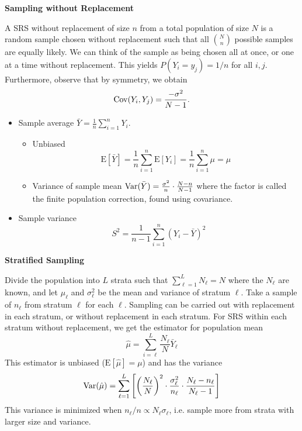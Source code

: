\documentclass[10pt,landscape]{article}
\newcommand{\E}{\text{E}}
\begin{document}
\begin{multicols*}{3}
\textbf{Sampling without Replacement}

A SRS without replacement of size $n$ from a total population of size $N$ is a random sample chosen without replacement such that all $ \binom{N}{n} $ possible samples are equally likely. We can think of the sample as being chosen all at once, or one at a time without replacement. This yields $P(Y_i = y_j) = 1/n$ for all $i,j$. Furthermore, observe that by symmetry, we obtain
\[
\operatorname{Cov}(Y_i,Y_j)=\frac{-\sigma^2}{N-1}.
\]

\begin{itemize}
    \item Sample average $\bar Y=\frac{1}{n}\sum_{i=1}^nY_i$.
    \begin{itemize}
        \item Unbiased
        $$
        \E[\bar Y]=\frac{1}{n}\sum_{i=1}^n\E[Y_i]=\frac{1}{n}\sum_{i=1}^n\mu=\mu
        $$
        \item Variance of sample mean $\operatorname{Var}(\bar Y)=\frac{\sigma^2}{n}\cdot \frac{N-n}{N-1}$ where the factor is called the finite population correction, found using covariance.
    \end{itemize}
    \item Sample variance
    $$
    S^2=\frac{1}{n-1}\sum_{i=1}^n(Y_i-\bar Y)^2
    $$
\end{itemize}

\textbf{Stratified Sampling}

Divide the population into $L$ strata such that $\sum_{\ell=1}^LN_\ell=N$ where the $N_\ell$ are known, and let $\mu_\ell$ and $\sigma_\ell^2$ be the mean and variance of stratum $\ell$. Take a sample of $n_\ell$ from stratum $\ell$ for each $\ell$. Sampling can be carried out with replacement in each stratum, or without replacement in each stratum. For SRS within each stratum without replacement, we get the estimator for population mean
$$
\hat\mu=\sum_{i=\ell}^L\frac{N_\ell}{N }\bar Y_\ell
$$
This estimator is unbiased ($\E[\hat\mu]=\mu$) and has the variance
$$
\operatorname{Var}(\hat\mu)=\sum_{\ell=1}^L\left[\left(\frac{N_\ell}{N}\right)^2\cdot\frac{\sigma_\ell^2}{n_\ell}\cdot\frac{N_\ell-n_\ell}{N_\ell-1}\right]
$$
This variance is minimized when $n_\ell/n\propto N_\ell\sigma_\ell$, i.e. sample more from strata with larger size and variance.


\end{multicols*}
\end{document}
